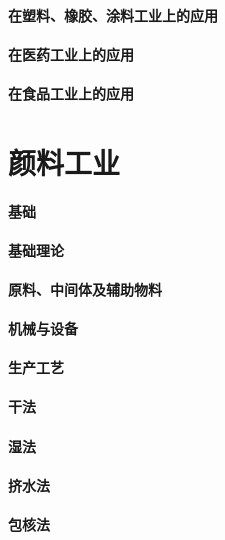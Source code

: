 \documentclass[UTF8]{../../ApplicationUniverse}
\begin{document}
    \subsubsection{在塑料、橡胶、涂料工业上的应用}
    \subsubsection{在医药工业上的应用}
    \subsubsection{在食品工业上的应用}








    


\chapter{颜料工业}
\subsubsection{基础}
    \subsubsection{基础理论}
    \subsubsection{原料、中间体及辅助物料}
    \subsubsection{机械与设备}
    \subsubsection{生产工艺}
        \subsubsection{干法}
        \subsubsection{湿法}
        \subsubsection{挤水法}
        \subsubsection{包核法}
\end{document}
